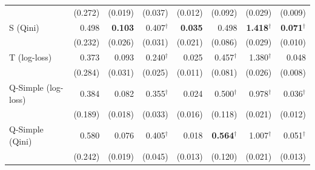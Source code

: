 \documentclass{article}
\begin{document}
\begin{table}[H]
\begin{tabular}{l|rrrrrrr}
 & \scriptsize (0.272) & \scriptsize (0.019) & \scriptsize (0.037) & \scriptsize (0.012) & \scriptsize (0.092) & \scriptsize (0.029) & \scriptsize (0.009) \\[2pt]
S (Qini) & 0.498 & \textbf{0.103} & 0.407$^\dagger$ & \textbf{0.035} & 0.498 & \textbf{1.418}$^\dagger$ & \textbf{0.071}$^\dagger$ \\
 & \scriptsize (0.232) & \scriptsize (0.026) & \scriptsize (0.031) & \scriptsize (0.021) & \scriptsize (0.086) & \scriptsize (0.029) & \scriptsize (0.010) \\[2pt]
T (log-loss) & 0.373 & 0.093 & 0.240$^\dagger$ & 0.025 & 0.457$^\dagger$ & 1.380$^\dagger$ & 0.048 \\
 & \scriptsize (0.284) & \scriptsize (0.031) & \scriptsize (0.025) & \scriptsize (0.011) & \scriptsize (0.081) & \scriptsize (0.026) & \scriptsize (0.008) \\[2pt]
Q-Simple (log-loss) & 0.384 & 0.082 & 0.355$^\dagger$ & 0.024 & 0.500$^\dagger$ & 0.978$^\dagger$ & 0.036$^\dagger$ \\
 & \scriptsize (0.189) & \scriptsize (0.018) & \scriptsize (0.033) & \scriptsize (0.016) & \scriptsize (0.118) & \scriptsize (0.021) & \scriptsize (0.012) \\[2pt]
Q-Simple (Qini) & 0.580 & 0.076 & 0.405$^\dagger$ & 0.018 & \textbf{0.564}$^\dagger$ & 1.007$^\dagger$ & 0.051$^\dagger$ \\
 & \scriptsize (0.242) & \scriptsize (0.019) & \scriptsize (0.045) & \scriptsize (0.013) & \scriptsize (0.120) & \scriptsize (0.021) & \scriptsize (0.013) \\[2pt]
\hline
\end{tabular}
\end{table}
\end{document}
